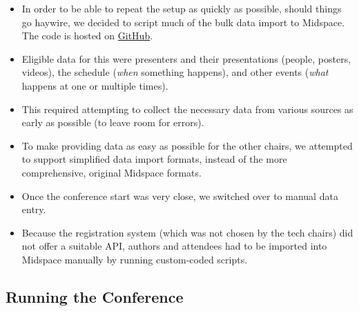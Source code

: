 \documentclass[%
10pt,								%
titlepage,						%
]
{scrartcl}
\begin{document}
\begin{itemize}
    \item In order to be able to repeat the setup as quickly as possible, should things go haywire, we decided to script much of the bulk data import to Midspace. The code is hosted on \href{https://github.com/ismir/ismir-2021-utils}{GitHub}.
    \item Eligible data for this were presenters and their presentations (people, posters, videos), the schedule (\emph{when} something happens), and other events (\emph{what} happens at one or multiple times).
    \item This required attempting to collect the necessary data from various sources as early as possible (to leave room for errors).
    \item To make providing data as easy as possible for the other chairs, we attempted to support simplified data import formats, instead of the more comprehensive, original Midspace formats.
    \item Once the conference start was very close, we switched over to manual data entry.
    \item Because the registration system (which was not chosen by the tech chairs) did not offer a suitable API, authors and attendees had to be imported into Midspace manually by running custom-coded scripts.
\end{itemize}

\subsection{Running the Conference}
\end{document}
